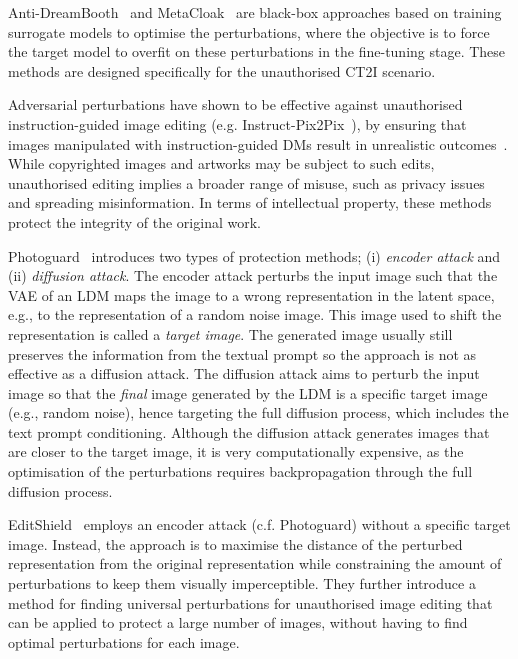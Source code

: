 \documentclass[conference,table]{IEEEtran} %
\begin{document}
Anti-DreamBooth~\cite{van_le_anti-dreambooth_2023} and MetaCloak~\cite{liu_toward_2023} are black-box approaches based on training surrogate models to optimise the perturbations, where the objective is to force the target model to overfit on these perturbations in the fine-tuning stage. These methods are designed specifically for the unauthorised CT2I scenario.

Adversarial perturbations have shown to be effective against unauthorised instruction-guided image editing (e.g. Instruct-Pix2Pix~\cite{brooks_instructpix2pix_2023}),
by ensuring that images manipulated with instruction-guided DMs result in unrealistic outcomes~\cite{chen_editshield_2023,salman_raising_2023}. 
While copyrighted images and artworks may be subject to such edits, unauthorised editing implies a broader range of misuse, such as privacy issues and spreading misinformation. %
In terms of intellectual property, these methods protect the integrity of the original work. 

Photoguard~\cite{salman_raising_2023} introduces two types of protection methods; (i) \textit{encoder attack} and (ii) \textit{diffusion attack}.
The encoder attack perturbs the input image such that the VAE of an LDM maps the image to a wrong representation in the latent space, e.g., to the representation of a random noise image. This image used to shift the representation is called a \textit{target image}. 
The generated image usually still preserves the information from the textual prompt so the approach is not as effective as a diffusion attack.
The diffusion attack aims to perturb the input image so that the \textit{final} image generated by the LDM is a specific target image (e.g., random noise), hence targeting the full diffusion process, which includes the text prompt conditioning.
Although the diffusion attack generates images that are closer to the target image, it is very computationally expensive, as the optimisation of the perturbations requires backpropagation through the full diffusion process.

EditShield~\cite{chen_editshield_2023} employs an encoder attack (c.f. Photoguard) without a specific target image. 
Instead, the approach is to maximise the distance of the perturbed representation from the original representation while constraining the amount of perturbations to keep them visually imperceptible. 
They further introduce a method for finding universal perturbations for unauthorised image editing that can be applied to protect a large number of images, without having to find optimal perturbations for each image. %
\end{document}
